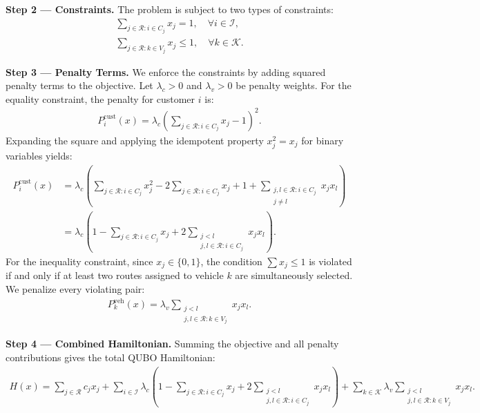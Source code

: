 \documentclass[12pt]{article}
\begin{document}
\textbf{Step 2 --- Constraints.}
The problem is subject to two types of constraints:
\begin{align}
  \sum_{j \in \mathcal{R}: i \in C_j} x_j = 1, \quad \forall i \in \mathcal{I}, \\
  \sum_{j \in \mathcal{R}: k \in V_j} x_j \le 1, \quad \forall k \in \mathcal{K}.
\end{align}

\textbf{Step 3 --- Penalty Terms.}
We enforce the constraints by adding squared penalty terms to the objective. Let $\lambda_c > 0$ and $\lambda_v > 0$ be penalty weights.
For the equality constraint, the penalty for customer $i$ is:
\begin{align}
  P_i^{\text{cust}}(x) = \lambda_c \left( \sum_{j \in \mathcal{R}: i \in C_j} x_j - 1 \right)^2.
\end{align}
Expanding the square and applying the idempotent property $x_j^2 = x_j$ for binary variables yields:
\begin{align}
  P_i^{\text{cust}}(x) &= \lambda_c \left( \sum_{j \in \mathcal{R}: i \in C_j} x_j^2 - 2 \sum_{j \in \mathcal{R}: i \in C_j} x_j + 1 + \sum_{\substack{j, l \in \mathcal{R}: i \in C_j \\ j \neq l}} x_j x_l \right) \nonumber \\
  &= \lambda_c \left( 1 - \sum_{j \in \mathcal{R}: i \in C_j} x_j + 2 \sum_{\substack{j < l \\ j, l \in \mathcal{R}: i \in C_j}} x_j x_l \right).
\end{align}
For the inequality constraint, since $x_j \in \{0, 1\}$, the condition $\sum x_j \le 1$ is violated if and only if at least two routes assigned to vehicle $k$ are simultaneously selected. We penalize every violating pair:
\begin{align}
  P_k^{\text{veh}}(x) = \lambda_v \sum_{\substack{j < l \\ j, l \in \mathcal{R}: k \in V_j}} x_j x_l.
\end{align}

\textbf{Step 4 --- Combined Hamiltonian.}
Summing the objective and all penalty contributions gives the total QUBO Hamiltonian:
\begin{align}
  H(x) = \sum_{j \in \mathcal{R}} c_j x_j + \sum_{i \in \mathcal{I}} \lambda_c \left( 1 - \sum_{j \in \mathcal{R}: i \in C_j} x_j + 2 \sum_{\substack{j < l \\ j, l \in \mathcal{R}: i \in C_j}} x_j x_l \right) + \sum_{k \in \mathcal{K}} \lambda_v \sum_{\substack{j < l \\ j, l \in \mathcal{R}: k \in V_j}} x_j x_l.
\end{align}
\end{document}
